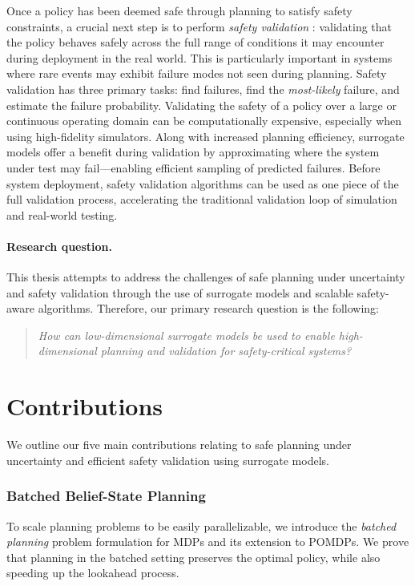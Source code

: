 Once a policy has been deemed safe through planning to satisfy safety constraints, a crucial next step is to perform \textit{safety validation} \cite{corso2021survey}: validating that the policy behaves safely across the full range of conditions it may encounter during deployment in the real world.
This is particularly important in systems where rare events may exhibit failure modes not seen during planning.
Safety validation has three primary tasks: find failures, find the \textit{most-likely} failure, and estimate the failure probability.
Validating the safety of a policy over a large or continuous operating domain can be computationally expensive, especially when using high-fidelity simulators.
Along with increased planning efficiency, surrogate models offer a benefit during validation by approximating where the system under test may fail---enabling efficient sampling of predicted failures.
Before system deployment, safety validation algorithms can be used as one piece of the full validation process, accelerating the traditional validation loop of simulation and real-world testing.

\paragraph{Research question.}
This thesis attempts to address the challenges of safe planning under uncertainty and safety validation through the use of surrogate models and scalable safety-aware algorithms.
Therefore, our primary research question is the following:
\begin{quote}
    \textit{How can low-dimensional surrogate models be used to enable high-dimensional planning and validation for safety-critical systems?}
\end{quote}

\section{Contributions}
We outline our five main contributions relating to safe planning under uncertainty and efficient safety validation using surrogate models.

\subsubsection{Batched Belief-State Planning}
To scale planning problems to be easily parallelizable, we introduce the \textit{batched planning} problem formulation for MDPs and its extension to POMDPs.
We prove that planning in the batched setting preserves the optimal policy, while also speeding up the lookahead process.

